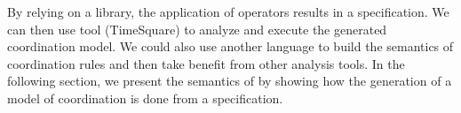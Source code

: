 By relying on a \moccml library, the application of \bcool operators results in a \ccsl specification. We can then use \ccsl tool (\eg TimeSquare\cite{timesquarebib}) to analyze and execute the generated coordination model. We could also use another language to build the semantics of coordination rules and then take benefit from other analysis tools. In the following section, we present the semantics of \bcool by showing how the generation of a model of coordination is done from a \bcool specification. 

	
